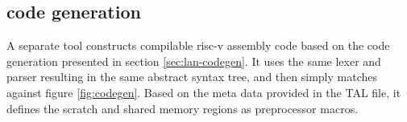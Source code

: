 % 
% 
% 
% 

\subsection{code generation}
A separate tool constructs compilable risc-v assembly code based on the code
generation presented in section \ref{sec:lan-codegen}.
It uses the same lexer and parser resulting in the same abstract syntax tree,
and then simply matches against figure \ref{fig:codegen}.
Based on the meta data provided in the TAL file, it defines the scratch and
shared memory regions as preprocessor macros.



